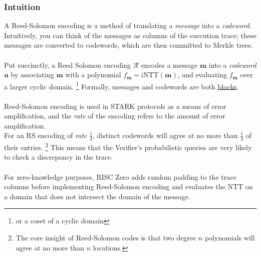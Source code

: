 \documentclass[10pt,letterpaper,titlepage]{article}
\theoremstyle{definition}
\begin{document}
\begin{appendices}
\subsubsection{Intuition}
A Reed-Solomon encoding is a method of translating a \textit{message} into a \textit{codeword}. 
Intuitively, you can think of the messages as columns of the execution trace; 
these messages are converted to codewords, which are then committed to Merkle trees.  \\
\\
Put succinctly, a Reed Solomon encoding $\mathcal{R}$ encodes a message $\mathbf{m}$ into a \textit{codeword} $\mathbf{u}$ by associating $\mathbf{m}$ with a polynomial $f_{\mathbf{m}} = \text{iNTT}(\mathbf{m})$, and evaluating $f_{\mathbf{m}}$ over a larger cyclic domain.%
\footnote{or a coset of a cyclic domain}
Formally, messages and codewords are both \hyperref[blocks]{blocks}. \\
\\
Reed-Solomon encoding is used in STARK protocols as a means of error amplification, and the \textit{rate} of the encoding refers to the amount of error amplification. \\
For an RS encoding of \textit{rate} $\frac{1}{4}$, distinct codewords will agree at no more than $\frac{1}{4}$ of their entries.%
\footnote{The core insight of Reed-Solomon codes is that two degree $n$ polynomials will agree at no more than $n$ locations.}
This means that the Verifier's probabilistic queries are very likely to check a discrepancy in the trace.
\\
\\
For zero-knowledge purposes, RISC Zero adds random padding to the trace columns before implementing Reed-Solomon encoding and evaluates the NTT on a domain that does not intersect the domain of the message. 


\end{appendices}
\end{document}
